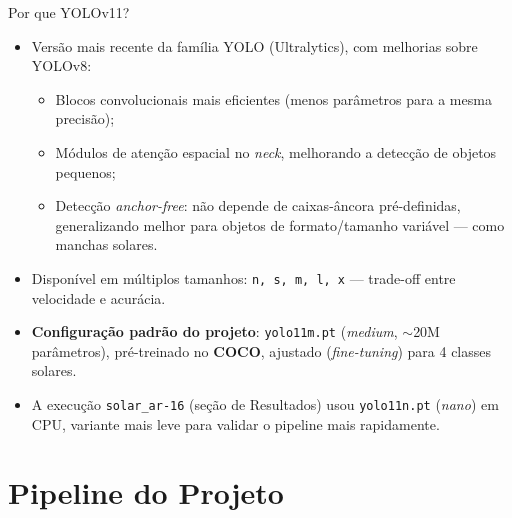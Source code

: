 \documentclass[aspectratio=169]{beamer}
\begin{document}
\begin{frame}{Por que YOLOv11?}
  \begin{itemize}
    \item Versão mais recente da família YOLO (Ultralytics), com melhorias sobre YOLOv8:
    \begin{itemize}
      \item Blocos convolucionais mais eficientes (menos parâmetros para a mesma precisão);
      \item Módulos de atenção espacial no \emph{neck}, melhorando a detecção de objetos pequenos;
      \item Detecção \emph{anchor-free}: não depende de caixas-âncora pré-definidas, generalizando melhor para objetos de formato/tamanho variável — como manchas solares.
    \end{itemize}
    \item Disponível em múltiplos tamanhos: \texttt{n, s, m, l, x} — trade-off entre velocidade e acurácia.
    \item \textbf{Configuração padrão do projeto}: \texttt{yolo11m.pt} (\emph{medium}, $\sim$20M parâmetros), pré-treinado no \textbf{COCO}, ajustado (\emph{fine-tuning}) para 4 classes solares.
    \item A execução \texttt{solar\_ar-16} (seção de Resultados) usou \texttt{yolo11n.pt} (\emph{nano}) em CPU, variante mais leve para validar o pipeline mais rapidamente.
  \end{itemize}
\end{frame}

\section{Pipeline do Projeto}
\end{document}
